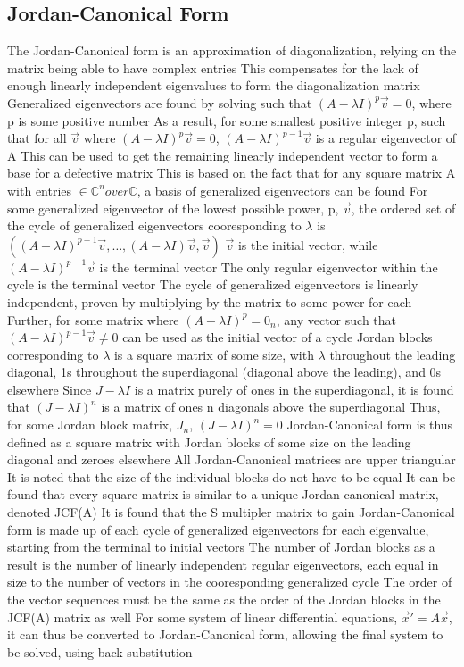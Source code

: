 \documentclass[11 pt, twoside]{article}
\newenvironment{outline*}
{
	\begin{outline}[enumerate]
	}
	{\end{outline}
}
\begin{document}
\subsection{Jordan-Canonical Form}
\begin{outline*}
\1 The Jordan-Canonical form is an approximation of diagonalization, relying on the matrix being able to have complex entries
\2 This compensates for the lack of enough linearly independent eigenvalues to form the diagonalization matrix
\1 Generalized eigenvectors are found by solving such that $(A - \lambda I)^p \vec{v} = 0$, where p is some positive number
\2 As a result, for some smallest positive integer p, such that for all $\vec{v}$ where $(A - \lambda I)^p \vec{v} = 0$, $(A - \lambda I)^{p-1}\vec{v}$ is a regular eigenvector of A
\2 This can be used to get the remaining linearly independent vector to form a base for a defective matrix
\3 This is based on the fact that for any square matrix A with entries $\in \mathbb{C}^n over \mathbb{C}$, a basis of generalized eigenvectors can be found
\2 For some generalized eigenvector of the lowest possible power, p, $\vec{v}$, the ordered set of the cycle of generalized eigenvectors cooresponding to $\lambda$ is $((A - \lambda I)^{p-1}\vec{v}, \dots, (A - \lambda I)\vec{v}, \vec{v})$
\3 $\vec{v}$ is the initial vector, while $(A - \lambda I)^{p-1}\vec{v}$ is the terminal vector
\3 The only regular eigenvector within the cycle is the terminal vector
\3 The cycle of generalized eigenvectors is linearly independent, proven by multiplying by the matrix to some power for each
\3 Further, for some matrix where $(A - \lambda I)^p = 0_n$, any vector such that $(A - \lambda I)^{p-1}\vec{v} \neq 0$ can be used as the initial vector of a cycle
\1 Jordan blocks corresponding to $\lambda$ is a square matrix of some size, with $\lambda$ throughout the leading diagonal, 1s throughout the superdiagonal (diagonal above the leading), and 0s elsewhere
\2 Since $J - \lambda I$ is a matrix purely of ones in the superdiagonal, it is found that $(J - \lambda I)^n$ is a matrix of ones n diagonals above the superdiagonal
\3 Thus, for some Jordan block matrix, $J_n$, $(J - \lambda I)^n = 0$
\2 Jordan-Canonical form is thus defined as a square matrix with Jordan blocks of some size on the leading diagonal and zeroes elsewhere
\3 All Jordan-Canonical matrices are upper triangular
\3 It is noted that the size of the individual blocks do not have to be equal
\2 It can be found that every square matrix is similar to a unique Jordan canonical matrix, denoted JCF(A)
\2 It is found that the S multipler matrix to gain Jordan-Canonical form is made up of each cycle of generalized eigenvectors for each eigenvalue, starting from the terminal to initial vectors
\3 The number of Jordan blocks as a result is the number of linearly independent regular eigenvectors, each equal in size to the number of vectors in the cooresponding generalized cycle
\3 The order of the vector sequences must be the same as the order of the Jordan blocks in the JCF(A) matrix as well
\1 For some system of linear differential equations, $\vec{x}' = A\vec{x}$, it can thus be converted to Jordan-Canonical form, allowing the final system to be solved, using back substitution
\end{outline*}
\end{document}
